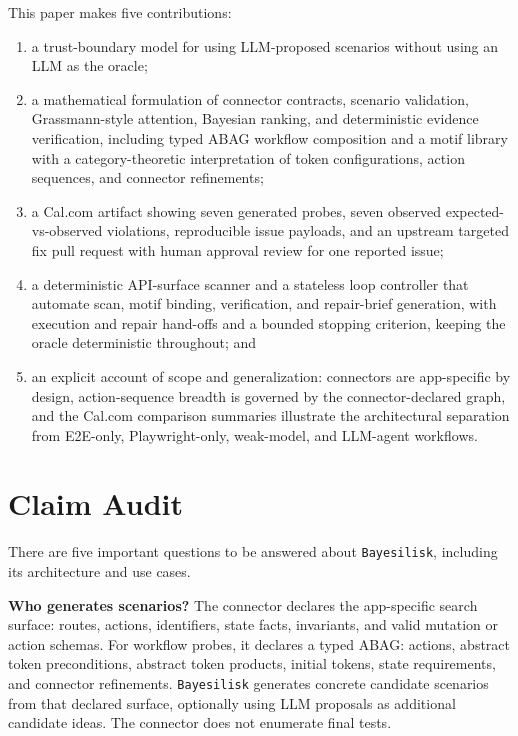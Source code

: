 \documentclass[10pt]{article}
\newcommand{\tool}{\texttt{Bayesilisk}\xspace}
\begin{document}
This paper makes five contributions:

\begin{enumerate}
  \item a trust-boundary model for using LLM-proposed scenarios without using an
        LLM as the oracle;
  \item a mathematical formulation of connector contracts, scenario validation,
        Grassmann-style attention, Bayesian ranking, and deterministic
        evidence verification, including typed ABAG workflow composition and a
        motif library with a category-theoretic interpretation of token
        configurations, action sequences, and connector refinements;
  \item a Cal.com artifact showing seven generated probes, seven observed
        expected-vs-observed violations, reproducible issue payloads, and an
        upstream targeted fix pull request with human approval review for one
        reported issue;
  \item a deterministic API-surface scanner and a stateless loop controller that
        automate scan, motif binding, verification, and repair-brief generation,
        with execution and repair hand-offs and a bounded stopping criterion,
        keeping the oracle deterministic throughout; and
  \item an explicit account of scope and generalization: connectors are
        app-specific by design, action-sequence breadth is governed by the
        connector-declared graph, and the Cal.com comparison summaries
        illustrate the architectural separation from E2E-only, Playwright-only,
        weak-model, and LLM-agent workflows.
\end{enumerate}

\section{Claim Audit}

There are five important questions to be answered about \tool, including its architecture and use cases.

\textbf{Who generates scenarios?} The connector declares the app-specific search
surface: routes, actions, identifiers, state facts, invariants, and valid
mutation or action schemas. For workflow probes, it declares a typed ABAG:
actions, abstract token preconditions, abstract token products, initial tokens, state
requirements, and connector refinements. \tool generates concrete candidate
scenarios from that declared surface, optionally using LLM proposals as
additional candidate ideas. The connector does not enumerate final tests.
\end{document}
